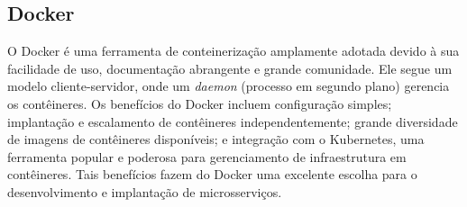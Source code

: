 \subsection*{Docker}
O Docker é uma ferramenta de conteinerização amplamente adotada devido à sua facilidade de uso, documentação abrangente e grande comunidade. Ele segue um modelo cliente-servidor, onde um \emph{daemon} (processo em segundo plano) gerencia os contêineres. Os benefícios do Docker incluem configuração simples; implantação e escalamento de contêineres independentemente; grande diversidade de imagens de contêineres disponíveis; e integração com o Kubernetes, uma ferramenta popular e poderosa para gerenciamento de infraestrutura em contêineres. Tais benefícios fazem do Docker uma excelente escolha para o desenvolvimento e implantação de microsserviços. \cite{lxc-vs-docker,podman-vs-docker}



    
    



